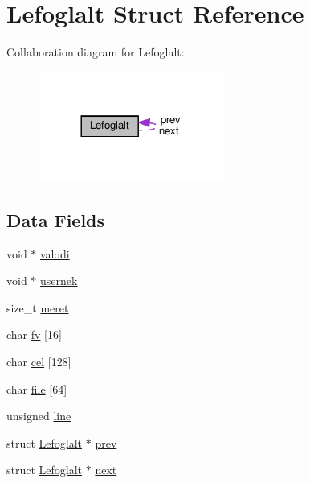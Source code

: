 \hypertarget{struct_lefoglalt}{}\section{Lefoglalt Struct Reference}
\label{struct_lefoglalt}


Collaboration diagram for Lefoglalt\+:
\nopagebreak
\begin{figure}[H]
\begin{center}
\leavevmode
\includegraphics[width=173pt]{struct_lefoglalt__coll__graph}
\end{center}
\end{figure}
\subsection*{Data Fields}
\begin{DoxyCompactItemize}
\item 
void $\ast$ \hyperlink{struct_lefoglalt_a59522ad17870bd526fae5bbbc8125966}{valodi}
\item 
void $\ast$ \hyperlink{struct_lefoglalt_a58c09d4017310a90fad327e926330b96}{usernek}
\item 
size\+\_\+t \hyperlink{struct_lefoglalt_a7054394a4199245d774ead13d3bed5d6}{meret}
\item 
char \hyperlink{struct_lefoglalt_abfdd6d3e984090f35c264b15cf69c81a}{fv} \mbox{[}16\mbox{]}
\item 
char \hyperlink{struct_lefoglalt_aa8cbe4c2c142597b17ff65623129109f}{cel} \mbox{[}128\mbox{]}
\item 
char \hyperlink{struct_lefoglalt_a353d29f9f9cc0db6fca9d49b5f88d34d}{file} \mbox{[}64\mbox{]}
\item 
unsigned \hyperlink{struct_lefoglalt_a05ef0c4dbeec4fc8ccb225de9c26d896}{line}
\item 
struct \hyperlink{struct_lefoglalt}{Lefoglalt} $\ast$ \hyperlink{struct_lefoglalt_a2b1e290e1bec4c24cb7ec2aaf8747687}{prev}
\item 
struct \hyperlink{struct_lefoglalt}{Lefoglalt} $\ast$ \hyperlink{struct_lefoglalt_adc30abdfb5e692e2c216e3673d0d19b9}{next}
\end{DoxyCompactItemize}


